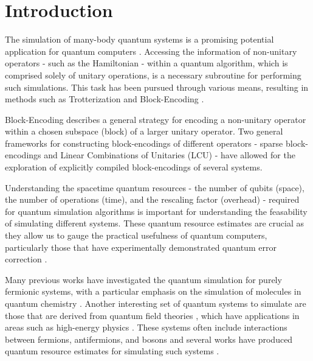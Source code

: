 \section{Introduction}
\label{sec:intro}

The simulation of many-body quantum systems is a promising potential application for quantum computers \cite{feynman2018simulating}.
Accessing the information of non-unitary operators - such as the Hamiltonian - within a quantum algorithm, which is comprised solely of unitary operations, is a necessary subroutine for performing such simulations.
This task has been pursued through various means, resulting in methods such as Trotterization \cite{suzuki1976generalized,hatano2005finding,lie1893theorie,trotter1959product,childs2021theory} and Block-Encoding \cite{lin2022lecture, poulin2018quantum, low2019hamiltonian}.

Block-Encoding describes a general strategy for encoding a non-unitary operator within a chosen subspace (block) of a larger unitary operator.
Two general frameworks for constructing block-encodings of different operators - sparse block-encodings \cite{berry2009black, childs2009universal, lin2022lecture} and Linear Combinations of Unitaries (LCU) \cite{childs2012hamiltonian} - have allowed for the exploration of explicitly compiled block-encodings of several systems.

Understanding the spacetime quantum resources - the number of qubits (space), the number of operations (time), and the rescaling factor (overhead) - required for quantum simulation algorithms is important for understanding the feasability of simulating different systems.
These quantum resource estimates are crucial as they allow us to gauge the practical usefulness of quantum computers, particularly those that have experimentally demonstrated quantum error correction \cite{bluvstein2024logical, acharya2024quantum}.

Many previous works have investigated the quantum simulation for purely fermionic systems, with a particular emphasis on the simulation of molecules in quantum chemistry \cite{aspuru2005simulated, peruzzo2014variational, babbush2014adiabatic, o2016scalable, babbush2018encoding, google2020hartree, lee2021even, kivlichan2020improved, campbell2021early}.
Another interesting set of quantum systems to simulate are those that are derived from quantum field theories \cite{Peskin:1995ev, jordan2012quantum} , which have applications in areas such as high-energy physics \cite{bauer2023quantum}.
These systems often include interactions between fermions, antifermions, and bosons and several works have produced quantum resource estimates for simulating such systems \cite{camps2024explicit, liu2024efficient, rhodes2024exponential}.

